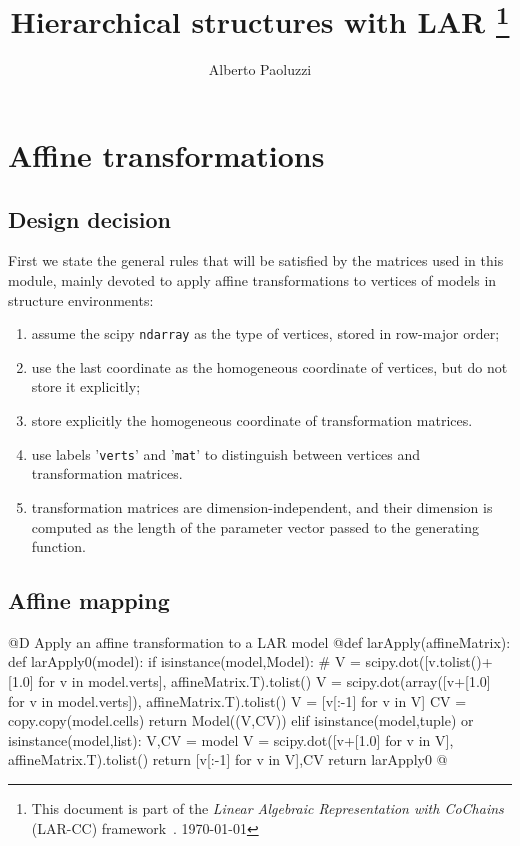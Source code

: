 \documentclass[11pt,oneside]{article}    %
\title{Hierarchical structures with LAR
\footnote{This document is part of the \emph{Linear Algebraic Representation with CoChains} (LAR-CC) framework~\cite{cclar-proj:2013:00}. \today}
}
\author{Alberto Paoluzzi}
\begin{document}
\maketitle
\nonstopmode

\tableofcontents



\section{Affine transformations}
\subsection{Design decision}
First we state the general rules that will be satisfied by the matrices used in this module, mainly devoted to apply affine transformations to vertices of models in structure environments:
\begin{enumerate}
\item assume the scipy \texttt{ndarray} as the type of vertices, stored in row-major order;
\item use the last coordinate as the homogeneous coordinate of vertices, but do not store it explicitly;
\item store explicitly the homogeneous coordinate of transformation matrices.
\item use labels '\texttt{verts}' and '\texttt{mat}' to distinguish between vertices and transformation matrices.
\item transformation matrices are dimension-independent, and their dimension is computed as the length of the parameter vector passed to the generating function.
\end{enumerate}


\subsection{Affine mapping}

@D Apply an affine transformation to a LAR model 
@{def larApply(affineMatrix):
    def larApply0(model):
        if isinstance(model,Model):
            # V = scipy.dot([v.tolist()+[1.0] for v in model.verts], affineMatrix.T).tolist()
            V = scipy.dot(array([v+[1.0] for v in model.verts]), affineMatrix.T).tolist()
            V = [v[:-1] for v in V]
            CV = copy.copy(model.cells)
            return Model((V,CV))
        elif isinstance(model,tuple) or isinstance(model,list):
            V,CV = model
            V = scipy.dot([v+[1.0] for v in V], affineMatrix.T).tolist()
            return [v[:-1] for v in V],CV
    return larApply0
@}
\end{document}
